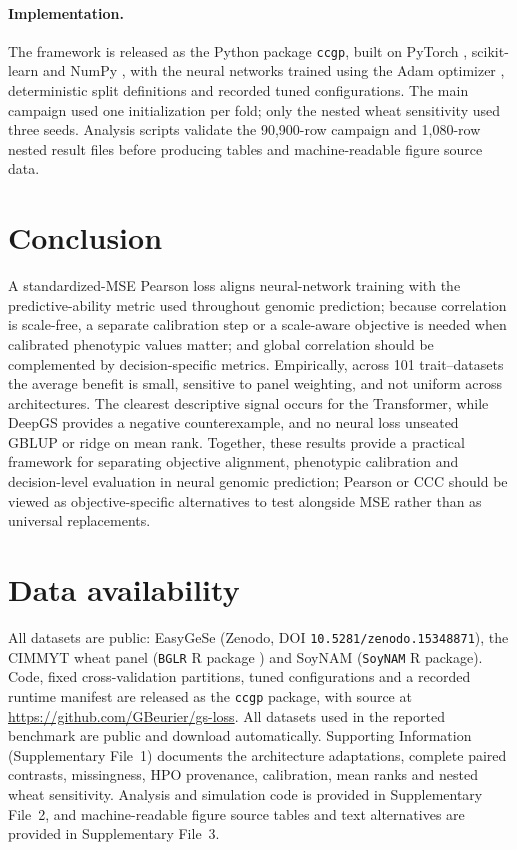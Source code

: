 \documentclass[11pt]{article}
\theoremstyle{plain}
\theoremstyle{remark}
\begin{document}
\paragraph{Implementation.} The framework is released as the Python package
\texttt{ccgp}, built on PyTorch \citep{paszke2019pytorch}, scikit-learn
\citep{pedregosa2011sklearn} and NumPy
\citep{harris2020numpy}, with the neural networks trained using the Adam optimizer
\citep{kingma2015adam}, deterministic split definitions and recorded tuned
configurations. The main campaign used one initialization per fold; only the
nested wheat sensitivity used three seeds. Analysis scripts validate the
90,900-row campaign and 1,080-row nested result files before producing tables
and machine-readable figure source data.





\section{Conclusion}
A standardized-MSE Pearson loss aligns neural-network training with the
predictive-ability metric used throughout genomic prediction; because correlation
is scale-free, a separate calibration step or a scale-aware objective is needed
when calibrated phenotypic values matter; and global correlation should be
complemented by decision-specific metrics. Empirically, across 101 trait--datasets the average
benefit is small, sensitive to panel weighting, and not uniform across
architectures. The clearest descriptive signal occurs for the Transformer,
while DeepGS provides a negative counterexample, and no neural loss unseated
GBLUP or ridge on mean rank. Together, these results provide a practical
framework for separating objective alignment, phenotypic calibration and
decision-level evaluation in neural genomic prediction; Pearson or CCC should be
viewed as objective-specific alternatives to test alongside MSE rather than as
universal replacements.

\section*{Data availability}
All datasets are public: EasyGeSe (Zenodo, DOI \texttt{10.5281/zenodo.15348871}), the CIMMYT wheat panel
(\texttt{BGLR} R package \citep{perez2014bglr}) and SoyNAM (\texttt{SoyNAM} R package). Code, fixed
cross-validation partitions, tuned configurations and a recorded runtime manifest are
released as the \texttt{ccgp} package, with source at
\url{https://github.com/GBeurier/gs-loss}. All datasets used in the reported
benchmark are public and download automatically. Supporting Information
(Supplementary File~1) documents the architecture adaptations, complete paired
contrasts, missingness, HPO provenance, calibration, mean ranks and nested wheat
sensitivity. Analysis and simulation code is provided in Supplementary File~2,
and machine-readable figure source tables and text alternatives are provided in
Supplementary File~3.
\end{document}
